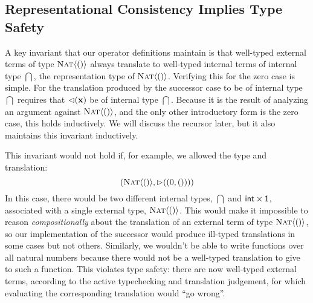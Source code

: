%

\subsection{Representational Consistency Implies Type Safety}\label{repcon}
A key invariant that our operator definitions maintain is that well-typed external terms of type $\textsc{Nat}\langle()\rangle$ always translate to well-typed internal terms of internal type $\dint$, the representation type of $\textsc{Nat}\langle()\rangle$. Verifying this for the zero case is simple. For the translation produced by the successor case to be of internal type $\dint$ requires that ${\lhd}({\textbf{x}})$ be of internal type $\dint$. Because it is the result of analyzing an argument against $\textsc{Nat}\langle()\rangle$, and the only other introductory form is the zero case, this holds inductively. We will discuss the recursor later, but it also maintains this invariant inductively.

This invariant would not hold if, for example, we allowed the type and translation: $$({{\textsc{Nat}\langle()\rangle,\rhd((0, ()))}})$$
\noindent
In this case, there would be two different internal types, $\dint$ and ${\sf int}\times\textsf{1}$,  associated with a single external type, $\textsc{Nat}\langle()\rangle$. This would make it impossible to reason \emph{compositionally} about the translation of an external term of type $\textsc{Nat}\langle()\rangle$, so our implementation of the successor would produce ill-typed translations in some cases but not others. Similarly, we wouldn't be able to write functions over all natural numbers because there would not be a well-typed translation to give to such a function. This violates type safety: there are now well-typed external terms, according to the active typechecking and translation judgement, for which evaluating the corresponding translation would ``go wrong''. 

